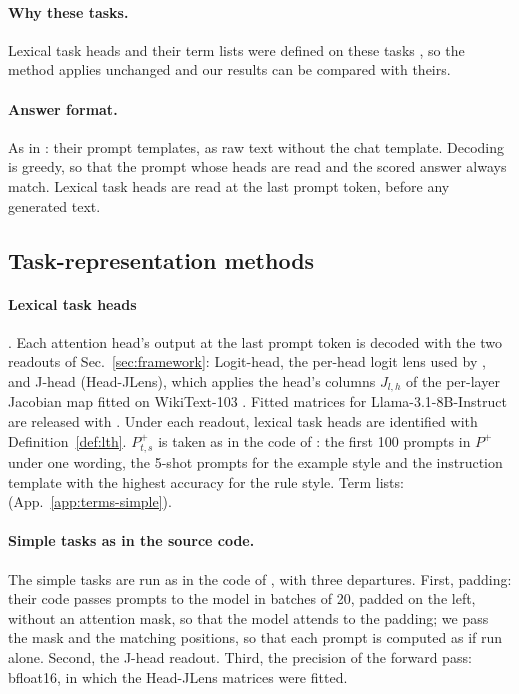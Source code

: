 \documentclass[11pt,a4paper]{article}
\begin{document}
\paragraph{Why these tasks.} Lexical task heads and their term lists were defined on these tasks \citep{yang2026shared}, so the method applies unchanged and our results can be compared with theirs.

\paragraph{Answer format.} As in \citet{yang2026shared}: their prompt templates, as raw text without the chat template. Decoding is greedy, so that the prompt whose heads are read and the scored answer always match. Lexical task heads are read at the last prompt token, before any generated text.

\subsection{Task-representation methods}\label{sec:trmethods}
\paragraph{Lexical task heads} \citep[Sec.~2.2.2]{yang2026shared}.
Each attention head's output at the last prompt token is decoded with the two readouts of Sec.~\ref{sec:framework}: Logit-head, the per-head logit lens used by \citet{yang2026shared} \citep{nostalgebraist2020logitlens}, and J-head (Head-JLens), which applies the head's columns $J_{l,h}$ of the per-layer Jacobian map fitted on WikiText-103 \citep[Sec.~2]{merlo2026headjlens}. Fitted matrices for Llama-3.1-8B-Instruct are released with \citet[Sec.~S4]{merlo2026headjlens}.
Under each readout, lexical task heads are identified with Definition~\ref{def:lth}.
$P^{+}_{t,s}$ is taken as in the code of \citet{yang2026shared}: the first 100 prompts in $P^{+}$ under one wording, the 5-shot prompts for the example style and the instruction template with the highest accuracy for the rule style. Term lists: \citet[App.~A.2.1]{yang2026shared} (App.~\ref{app:terms-simple}).

\paragraph{Simple tasks as in the source code.} The simple tasks are run as in the code of \citet{yang2026shared}, with three departures. First, padding: their code passes prompts to the model in batches of 20, padded on the left, without an attention mask, so that the model attends to the padding; we pass the mask and the matching positions, so that each prompt is computed as if run alone. Second, the J-head readout. Third, the precision of the forward pass: bfloat16, in which the Head-JLens matrices were fitted.
\end{document}
